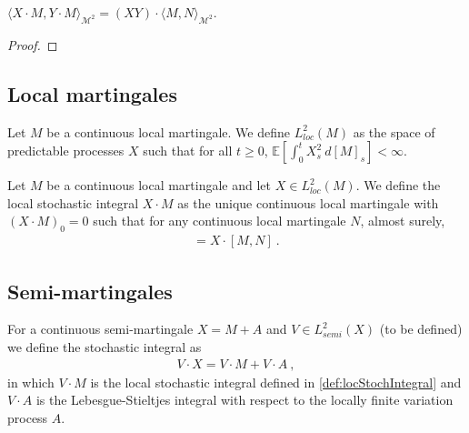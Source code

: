 \begin{lemma}\label{lem:inner_itoIsometry}
$\langle X \cdot M, Y \cdot M \rangle_{\mathcal{M}^2} = (XY) \cdot \langle M, N \rangle_{\mathcal{M}^2}$.
\end{lemma}

\begin{proof}

\end{proof}


\subsection{Local martingales}

\begin{definition}[$L^2_{loc}(M)$]\label{def:L2locM}
Let $M$ be a continuous local martingale.
We define $L^2_{loc}(M)$ as the space of predictable processes $X$ such that for all $t \ge 0$, $\mathbb{E}\left[ \int_0^t X_s^2 \: d[M]_s \right] < \infty$.
\end{definition}


\begin{definition}\label{def:locStochIntegral}
Let $M$ be a continuous local martingale and let $X \in L^2_{loc}(M)$.
We define the local stochastic integral $X \cdot M$ as the unique continuous local martingale with $(X \cdot M)_0 = 0$ such that for any continuous local martingale $N$, almost surely,
\begin{align*}
  [X \cdot M, N] = X \cdot [M, N]
  \: .
\end{align*}
\end{definition}


\subsection{Semi-martingales}

\begin{definition}\label{def:stochIntegral}
For a continuous semi-martingale $X = M + A$ and $V \in L^2_{semi}(X)$ (to be defined) we define the stochastic integral as
\begin{align*}
  V \cdot X = V \cdot M + V \cdot A
  \: ,
\end{align*}
in which $V \cdot M$ is the local stochastic integral defined in \ref{def:locStochIntegral} and $V \cdot A$ is the Lebesgue-Stieltjes integral with respect to the locally finite variation process $A$.
\end{definition}


